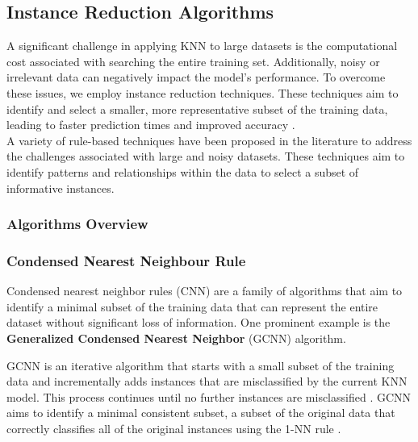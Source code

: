 
\subsection{Instance Reduction Algorithms}
\label{subsec:methods-reduction}

A significant challenge in applying KNN to large datasets is the computational cost 
associated with searching the entire training set. Additionally, noisy or irrelevant 
data can negatively impact the model's performance. 
To overcome these issues, we employ instance reduction techniques. 
These techniques aim to identify and select a smaller, more representative subset of
the training data, leading to faster prediction times and improved accuracy \cite{Wilson2000,largeScaleKNN}.\\

A variety of rule-based techniques have been proposed in the literature to 
address the challenges associated with large and noisy datasets. 
These techniques aim to identify patterns and relationships within the data to select 
a subset of informative instances.

\subsubsection{Algorithms Overview}

\subsubsection*{Condensed Nearest Neighbour Rule}
Condensed nearest neighbor rules (CNN) are a family of algorithms that aim to identify 
a minimal subset of the training data that can represent the entire dataset without 
significant loss of information. One prominent example is the \textbf{Generalized Condensed 
Nearest Neighbor} (GCNN) algorithm.

GCNN is an iterative algorithm that starts with a small subset of 
the training data and incrementally adds instances that are misclassified by the current KNN model. 
This process continues until no further instances are misclassified \cite{GCNN-JMLR}. GCNN aims to identify a minimal 
consistent subset, a subset of the original data that correctly classifies all of the original 
instances using the 1-NN rule \cite{GCNN-JMLR}.

